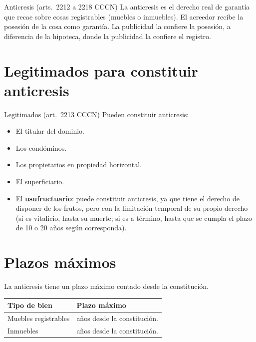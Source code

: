 \documentclass[12pt,oneside]{book}
\begin{document}
\begin{definition}{Anticresis (arts.\ 2212 a 2218 CCCN)}
La anticresis es el derecho real de garantía que recae sobre cosas registrables (muebles o inmuebles). El acreedor recibe la posesión de la cosa como garantía. La publicidad la confiere la posesión, a diferencia de la hipoteca, donde la publicidad la confiere el registro.
\end{definition}

\section{Legitimados para constituir anticresis}

\begin{definition}{Legitimados (art.\ 2213 CCCN)}
Pueden constituir anticresis:
\begin{itemize}
    \item El titular del dominio.
    \item Los condóminos.
    \item Los propietarios en propiedad horizontal.
    \item El superficiario.
    \item El \textbf{usufructuario}: puede constituir anticresis, ya que tiene el derecho de disponer de los frutos, pero con la limitación temporal de su propio derecho (si es vitalicio, hasta su muerte; si es a término, hasta que se cumpla el plazo de 10 o 20 años según corresponda).
\end{itemize}
\end{definition}

\section{Plazos máximos}

La anticresis tiene un plazo máximo contado desde la constitución.

\begin{table}[H]
\centering
\begin{tabularx}{\textwidth}{
    >{\raggedright\arraybackslash}p{}
    >{\raggedright\arraybackslash}X
}
\toprule
\textbf{Tipo de bien} & \textbf{Plazo máximo} \\
\midrule
Muebles registrables & 5 años desde la constitución. \\
Inmuebles & 10 años desde la constitución. \\
\bottomrule
\end{tabularx}
\end{table}
\end{document}
